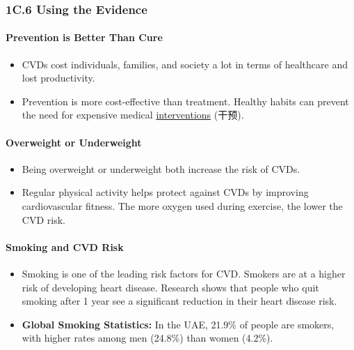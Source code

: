 
\subsubsection{1C.6 Using the Evidence}
\paragraph{Prevention is Better Than Cure}
\begin{itemize}
    \item CVDs cost individuals, families, and society a lot in terms of healthcare and lost productivity.
    \item Prevention is more cost-effective than treatment. Healthy habits can prevent the need for expensive medical
    \underline{interventions} (干预).
\end{itemize}

\paragraph{Overweight or Underweight}
\begin{itemize}
    \item Being overweight or underweight both increase the risk of CVDs.
    \item Regular physical activity helps protect against CVDs by improving cardiovascular fitness. The more oxygen used during
    exercise, the lower the CVD risk.
\end{itemize}

\paragraph{Smoking and CVD Risk}
\begin{itemize}
    \item Smoking is one of the leading risk factors for CVD. Smokers are at a higher risk of developing heart disease. Research
    shows that people who quit smoking after 1 year see a significant reduction in their heart disease risk.
    \item \textbf{Global Smoking Statistics:} In the UAE, 21.9\% of people are smokers, with higher rates among men (24.8\%) than
    women (4.2\%).
\end{itemize}

